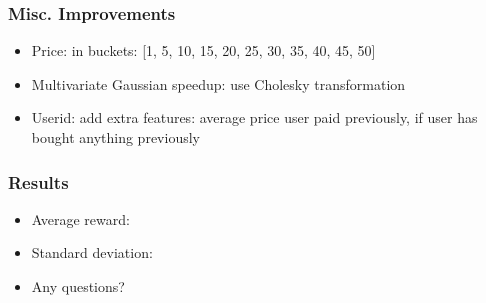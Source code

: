 \documentclass{beamer}
\begin{document}
\begin{frame}
	\frametitle{Misc. Improvements}
	\begin{itemize}
		\item Price: in buckets: [1, 5, 10, 15, 20, 25, 30, 35, 40, 45, 50]
		\item Multivariate Gaussian speedup: use Cholesky transformation
		\item Userid: add extra features: average price user paid previously, if user has bought anything previously
	\end{itemize}
\end{frame}


\begin{frame}
  \frametitle{Results}

  \begin{itemize}
    \item Average reward: 
    \item Standard deviation: 
    \item Any questions?
  \end{itemize}
\end{frame}
\end{document}
